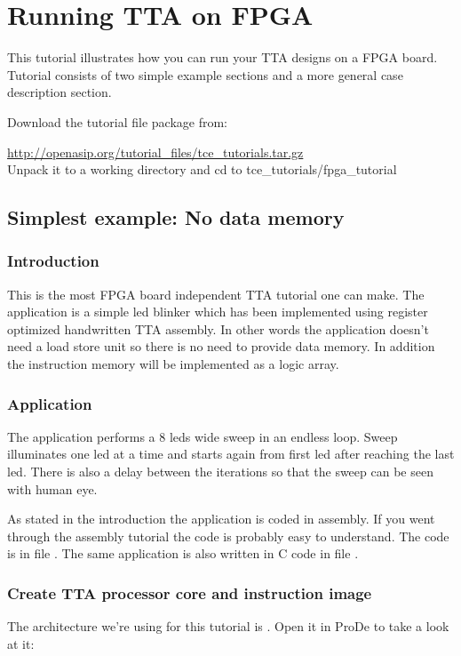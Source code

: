 \documentclass[a4paper,twoside]{tceusermanual}
\begin{document}
\section{Running TTA on FPGA}
\label{sec:fpgatutorial}

This tutorial illustrates how you can run your TTA designs on a FPGA board.
Tutorial consists of two simple example sections and a more general case
description section.

Download the tutorial file package from:

\url{http://openasip.org/tutorial_files/tce_tutorials.tar.gz}\\

Unpack it to a working directory and cd to tce\_tutorials/fpga\_tutorial

\subsection{Simplest example: No data memory}
\subsubsection{Introduction}
This is the most FPGA board independent TTA tutorial one can make. The
application is a simple led blinker which has been implemented using register
optimized handwritten TTA assembly. In other words the application
doesn't need a load store unit so there is no need to provide data memory. In
addition the instruction memory will be implemented as a logic array.

\subsubsection{Application}
The application performs a 8 leds wide sweep in an endless loop. Sweep 
illuminates one led at a time and starts again from first led after reaching
the last led. There is also a delay between the iterations so that the sweep
can be seen with human eye.

As stated in the introduction the application is coded in assembly. If you went
through the assembly tutorial the code is probably easy to understand. The code
is in file . The same application is also written in C code
in file .

\subsubsection{Create TTA processor core and instruction image}
The architecture we're using for this tutorial is . Open it
in ProDe to take a look at it:
\end{document}
